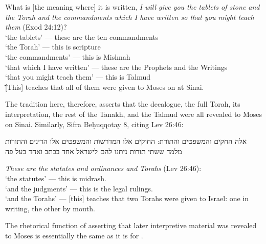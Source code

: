 \begin{translation}
    What is [the meaning where] it is written, \emph{I will give you the tablets of stone and the Torah and the commandments which I have written so that you might teach them} (Exod 24:12)?\\
    \-\hspace{2em}`the tablets' --- these are the ten commandments\\
    \-\hspace{2em}`the Torah' --- this is scripture\\
    \-\hspace{2em}`the commandments' --- this is Mishnah\\
    \-\hspace{2em}`that which I have written' --- these are the Prophets and the Writings\\
    \-\hspace{2em}`that you might teach them' --- this is Talmud\\\~
    [This] teaches that all of them were given to Moses on at Sinai.
\end{translation}

\noindent
The tradition here, therefore, asserts that the decalogue, the full Torah, its interpretation, the rest of the Tanakh, and the Talmud were all revealed to Moses on Sinai. Similarly, Sifra Beḥuqqotay 8, citing Lev 26:46:
\begin{aramaictext}
    אלה החקים והמשפטים והתורֹת: החוקים אלו המדרשות והמשפטים אלו הדינים והתורות מלמד ששתי תורות ניתנו להם לישראל אחד בכתב ואחד בעל פה
\end{aramaictext}
\begin{translation}
    \emph{These are the statutes and ordinances and Torahs} (Lev 26:46):\\
    \-\hspace{2em} `the statutes' --- this is midrash.\\
    \-\hspace{2em} `and the judgments' --- this is the legal rulings.\\
    \-\hspace{2em} `and the Torahs' --- [this] teaches that two Torahs were given to Israel: one in writing, the other by mouth.
\end{translation}

\noindent
The rhetorical function of asserting that later interpretive material was revealed to Moses is essentially the same as it is for \jub.

